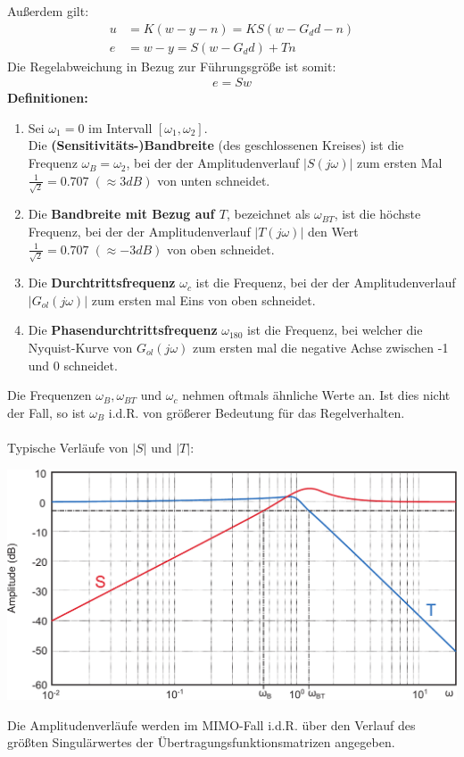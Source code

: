 \documentclass[a4paper,twocolumn,10pt]{article}
\begin{document}
Außerdem gilt:
\begin{align*}
u&=K(w-y-n)=KS(w-G_dd-n)\\
e&=w-y=S(w-G_dd)+Tn
\end{align*}
Die Regelabweichung in Bezug zur Führungsgröße ist somit:
\begin{align*}
e=Sw
\end{align*}
\textbf{Definitionen:}
\begin{enumerate}[label=$\bullet$]
\item Sei $\omega_1=0$ im Intervall $[\omega_1,\omega_2]$.\\
Die \textbf{(Sensitivitäts-)Bandbreite} (des geschlossenen Kreises) ist die Frequenz $\omega_B=\omega_2$, bei der der Amplitudenverlauf $|S(j\omega)|$ zum ersten Mal $\frac{1}{\sqrt{2}}=0.707\;(\approx 3dB)$ von unten schneidet.
\item Die \textbf{Bandbreite mit Bezug auf $T$}, bezeichnet als $\omega_{BT}$, ist die höchste Frequenz, bei der der Amplitudenverlauf $|T(j\omega)|$ den Wert $\frac{1}{\sqrt{2}}=0.707\;(\approx -3dB)$ von oben schneidet.
\item Die \textbf{Durchtrittsfrequenz} $\omega_c$ ist die Frequenz, bei der der Amplitudenverlauf $|G_{ol}(j\omega)|$ zum ersten mal Eins von oben schneidet.
\item Die \textbf{Phasendurchtrittsfrequenz} $\omega_{180}$ ist die Frequenz, bei welcher die Nyquist-Kurve von $G_{ol}(j\omega)$ zum ersten mal die negative Achse zwischen -1 und 0 schneidet.
\end{enumerate}
Die Frequenzen $\omega_B,\omega_{BT}$ und $\omega_c$ nehmen oftmals ähnliche Werte an. Ist dies nicht der Fall, so ist $\omega_B$ i.d.R. von größerer Bedeutung für das Regelverhalten.\\\\
Typische Verläufe von $|S|$ und $|T|$:
\begin{center}
\includegraphics[width=0.98\columnwidth]{Grafiken/Bodediagramm_S_T}
\end{center}
Die Amplitudenverläufe werden im MIMO-Fall i.d.R. über den Verlauf des größten Singulärwertes der Übertragungsfunktionsmatrizen angegeben.
\end{document}
